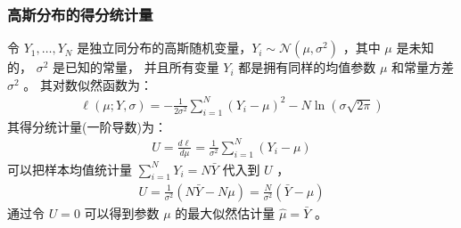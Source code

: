 \documentclass[letterpaper,10pt,english]{sphinxmanual}
\begin{document}
\subsubsection{高斯分布的得分统计量}
\label{\detokenize{_u6a21_u578b_u8bc4_u4f30/influence:id2}}
令 \(Y_1,\dots,Y_N\) 是独立同分布的高斯随机变量，\(Y_i \sim \mathcal{N}(\mu,\sigma^2)\)
，其中 \(\mu\) 是未知的， \(\sigma^2\) 是已知的常量，
并且所有变量 \(Y_i\) 都是拥有同样的均值参数 \(\mu\) 和常量方差 \(\sigma^2\) 。
其对数似然函数为：
\begin{equation}\label{equation:模型评估/influence:模型评估/influence:10}
\begin{split}\ell(\mu;Y,\sigma) = -\frac{1}{2\sigma^2} \sum_{i=1}^N (Y_i -\mu)^2 - N \ln (\sigma \sqrt{2\pi})\end{split}
\end{equation}
其得分统计量(一阶导数)为：
\begin{equation}\label{equation:模型评估/influence:eq_glm_influence_020}
\begin{split}U = \frac{d \ell}{d \mu} = \frac{1}{\sigma^2} \sum_{i=1}^N (Y_i -\mu)\end{split}
\end{equation}
可以把样本均值统计量 \(\sum_{i=1}^N Y_i = N \bar{Y}\) 代入到 \(U\) ，
\begin{equation}\label{equation:模型评估/influence:模型评估/influence:11}
\begin{split}U = \frac{1}{\sigma^2} ( N \bar{Y} - N \mu)
=\frac{N}{\sigma^2} (\bar{Y} - \mu)\end{split}
\end{equation}
通过令 \(U=0\) 可以得到参数 \(\mu\) 的最大似然估计量 \(\hat{\mu}=\bar{Y}\)
。
\end{document}

